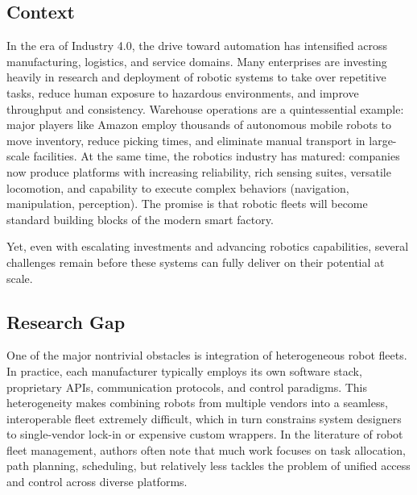 \documentclass[conference]{IEEEtran}
\begin{document}
\subsection{Context}
In the era of Industry 4.0, 
 the drive toward automation has intensified across manufacturing, 
 logistics, and service domains. 
% 
Many enterprises are investing heavily in research and deployment of robotic systems 
to take over repetitive tasks, reduce human exposure to hazardous environments, 
 and improve throughput and consistency. 
% 
Warehouse operations are a quintessential example: 
 major players like Amazon employ thousands of autonomous mobile robots to move inventory, 
 reduce picking times, and eliminate manual transport in large-scale facilities.
%
At the same time, the robotics industry has matured: 
 companies now produce platforms with increasing reliability, rich sensing suites, versatile locomotion, 
 and capability to execute complex behaviors (navigation, manipulation, perception). 
% 
The promise is that robotic fleets will become standard building blocks of the modern smart factory.

Yet, even with escalating investments and advancing robotics capabilities, 
 several challenges remain before these systems can fully deliver on their potential at scale.

\subsection{Research Gap}

One of the major nontrivial obstacles is integration of heterogeneous robot fleets. 
%
In practice, 
 each manufacturer typically employs its own software stack, proprietary APIs, 
 communication protocols, and control paradigms. 
% 
This heterogeneity makes combining robots from multiple vendors into a seamless, 
 interoperable fleet extremely difficult, which in turn constrains system designers 
 to single-vendor lock-in or expensive custom wrappers. 
% 
In the literature of robot fleet management, 
 authors often note that much work focuses on task allocation, path planning, scheduling, 
 but relatively less tackles the problem of unified access and control across diverse platforms. 
\end{document}

